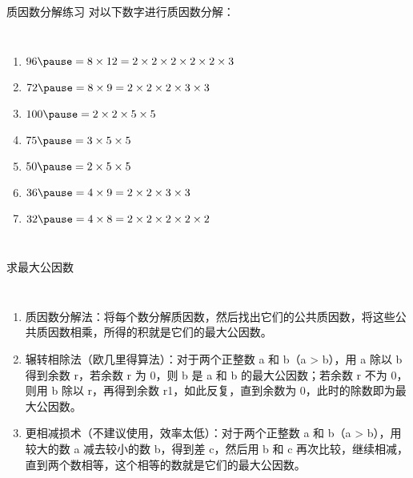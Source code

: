 \documentclass[aspectratio=169]{ctexbeamer} %
\begin{document}
\begin{frame}[t]{质因数分解练习}
对以下数字进行质因数分解：
\begin{columns}
\begin{enumerate}[label={\arabic*.}]
\item $96 \pause = 8 \times 12 = 2 \times 2 \times 2 \times 2 \times 2 \times 3$
\item $72 \pause = 8 \times 9 = 2 \times 2 \times 2 \times 3 \times 3$
\item $100 \pause = 2 \times 2 \times 5 \times 5$
\item $75 \pause = 3 \times 5 \times 5$
\item $50 \pause = 2 \times 5 \times 5$
\item $36 \pause = 4 \times 9 = 2 \times 2 \times 3 \times 3$
\item $32 \pause = 4 \times 8 = 2 \times 2 \times 2 \times 2 \times 2$
\end{enumerate}
\end{columns}
\end{frame}

\begin{frame}[t]{求最大公因数}
\begin{columns}
\begin{enumerate}[label={\arabic*.}]
\item \alert{质因数分解法：}将每个数分解质因数，然后找出它们的公共质因数，将这些公共质因数相乘，所得的积就是它们的最大公因数。
\item \alert{辗转相除法（欧几里得算法）：}对于两个正整数 a 和 b（a > b），用 a 除以 b 得到余数 r，若余数 r 为 0，则 b 是 a 和 b 的最大公因数；若余数 r 不为 0，则用 b 除以 r，再得到余数 r1，如此反复，直到余数为 0，此时的除数即为最大公因数。
\item \alert{更相减损术（不建议使用，效率太低）：}对于两个正整数 a 和 b（a > b），用较大的数 a 减去较小的数 b，得到差 c，然后用 b 和 c 再次比较，继续相减，直到两个数相等，这个相等的数就是它们的最大公因数。
\end{enumerate}
\end{columns}
\end{frame}
\end{document}

